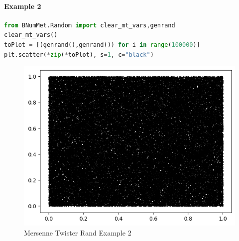 \paragraph{Example 2}{
\begin{lstlisting}[language=Python]
from BNumMet.Random import clear_mt_vars,genrand
clear_mt_vars()
toPlot = [(genrand(),genrand()) for i in range(100000)]
plt.scatter(*zip(*toPlot), s=1, c="black")
\end{lstlisting}
\begin{figure}[H]
    \centering
    \includegraphics{Include/Images/Thesis/Documentation/Randomness/MersenneTwister Rand Example 2.png}
    \caption{Mersenne Twister Rand Example 2}
    \label{fig:Mersenne Twister Rand Example 2}
\end{figure}
}